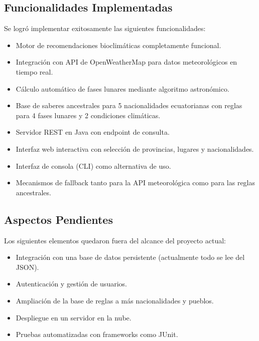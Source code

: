 \documentclass[conference]{IEEEtran}
\begin{document}
\subsection{Funcionalidades Implementadas}

Se logró implementar exitosamente las siguientes funcionalidades:

\begin{itemize}
    \item Motor de recomendaciones bioclimáticas completamente funcional.
    \item Integración con API de OpenWeatherMap para datos meteorológicos en tiempo real.
    \item Cálculo automático de fases lunares mediante algoritmo astronómico.
    \item Base de saberes ancestrales para 5 nacionalidades ecuatorianas con reglas para 4 fases lunares y 2 condiciones climáticas.
    \item Servidor REST en Java con endpoint de consulta.
    \item Interfaz web interactiva con selección de provincias, lugares y nacionalidades.
    \item Interfaz de consola (CLI) como alternativa de uso.
    \item Mecanismos de fallback tanto para la API meteorológica como para las reglas ancestrales.
\end{itemize}

\subsection{Aspectos Pendientes}

Los siguientes elementos quedaron fuera del alcance del proyecto actual:

\begin{itemize}
    \item Integración con una base de datos persistente (actualmente todo se lee del JSON).
    \item Autenticación y gestión de usuarios.
    \item Ampliación de la base de reglas a más nacionalidades y pueblos.
    \item Despliegue en un servidor en la nube.
    \item Pruebas automatizadas con frameworks como JUnit.
\end{itemize}

\end{document}
